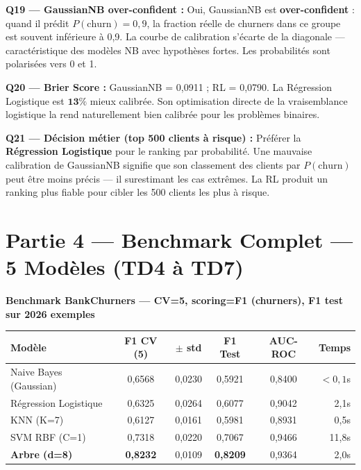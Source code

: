 \documentclass[12pt,a4paper]{article}
\begin{document}
\begin{reponsebox}
\textbf{Q19 — GaussianNB over-confident :}
Oui, GaussianNB est \textbf{over-confident} : quand il prédit $P(\text{churn}) = 0{,}9$, la fraction réelle de churners dans ce groupe est souvent inférieure à 0{,}9. La courbe de calibration s'écarte de la diagonale — caractéristique des modèles NB avec hypothèses fortes. Les probabilités sont polarisées vers 0 et 1.

\textbf{Q20 — Brier Score :} GaussianNB = 0{,}0911 ; RL = 0{,}0790. La Régression Logistique est $\mathbf{13\%}$ mieux calibrée. Son optimisation directe de la vraisemblance logistique la rend naturellement bien calibrée pour les problèmes binaires.

\textbf{Q21 — Décision métier (top 500 clients à risque) :}
Préférer la \textbf{Régression Logistique} pour le ranking par probabilité. Une mauvaise calibration de GaussianNB signifie que son classement des clients par $P(\text{churn})$ peut être moins précis — il surestimant les cas extrêmes. La RL produit un ranking plus fiable pour cibler les 500 clients les plus à risque.
\end{reponsebox}

\section{Partie 4 — Benchmark Complet — 5 Modèles (TD4 à TD7)}

\begin{resultbox}
\textbf{Benchmark BankChurners — CV=5, scoring=F1 (churners), F1 test sur 2026 exemples}
\begin{center}
\renewcommand{\arraystretch}{1.3}
\begin{tabular}{lccccr}
\toprule
\textbf{Modèle} & \textbf{F1 CV (5)} & \textbf{$\pm$ std} & \textbf{F1 Test} & \textbf{AUC-ROC} & \textbf{Temps} \\
\midrule
Naive Bayes (Gaussian) & 0{,}6568 & 0{,}0230 & 0{,}5921 & 0{,}8400 & $<0{,}1$s \\
Régression Logistique  & 0{,}6325 & 0{,}0264 & 0{,}6077 & 0{,}9042 & 2{,}1s \\
KNN (K=7)              & 0{,}6127 & 0{,}0161 & 0{,}5981 & 0{,}8931 & 0{,}5s \\
SVM RBF (C=1)          & 0{,}7318 & 0{,}0220 & 0{,}7067 & 0{,}9466 & 11{,}8s \\
\rowcolor{tealcolor!15}
\textbf{Arbre (d=8)}   & \textbf{0{,}8232} & 0{,}0109 & \textbf{0{,}8209} & 0{,}9364 & 2{,}0s \\
\bottomrule
\end{tabular}
\end{center}
\end{resultbox}
\end{document}

